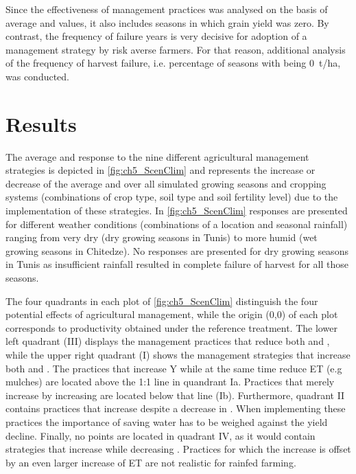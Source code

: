Since the effectiveness of management practices was analysed on the basis of average \Y and \WPET values, it also includes seasons in which grain yield was zero. By contrast, the frequency of failure years is very decisive for adoption of a management strategy by risk averse farmers. For that reason, additional analysis of the frequency of harvest failure, i.e. percentage of seasons with \Y being \SI{0}{t/ha}, was conducted.

\section{Results}
The average \Y and \WPET response to the nine different agricultural management strategies is depicted in \autoref{fig:ch5_ScenClim} and represents the increase or decrease of the average \Y and \WPET over all simulated growing seasons and cropping systems (combinations of crop type, soil type and soil fertility level) due to the implementation of these strategies. In \autoref{fig:ch5_ScenClim} responses are presented for different weather conditions (combinations of a location and seasonal rainfall) ranging from very dry (dry growing seasons in Tunis) to more humid (wet growing seasons in Chitedze). No responses are presented for dry growing seasons in Tunis as insufficient rainfall resulted in complete failure of harvest for all those seasons. 

The four quadrants in each plot of \autoref{fig:ch5_ScenClim} distinguish the four potential effects of agricultural management, while the origin (0,0) of each plot corresponds to productivity obtained under the reference treatment. The lower left quadrant (III) displays the management practices that reduce both \Y and \WPET, while the upper right quadrant (I) shows the management strategies that increase both \Y and \WPET. The practices that increase Y while at the same time reduce ET (e.g mulches) are located above the 1:1 line in quandrant Ia. Practices that merely increase \WPET by increasing \Y are located below that line (Ib). Furthermore, quadrant II contains practices that increase \WPET despite a decrease in \Y. When implementing these practices the importance of saving water has to be weighed against the yield decline. Finally, no points are located in quadrant IV, as it would contain strategies that increase \Y while decreasing \WPET. Practices for which the \Y increase is offset by an even larger increase of ET are not realistic for rainfed farming.

